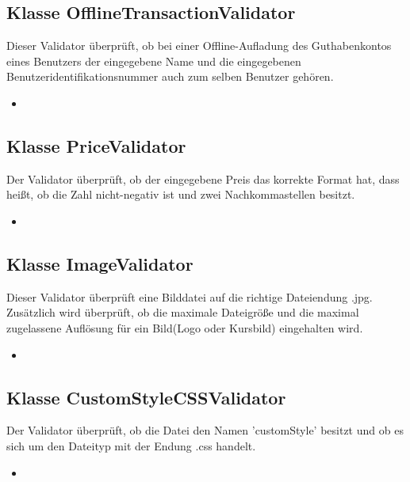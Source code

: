 	\subsection{Klasse OfflineTransactionValidator}
	Dieser Validator überprüft, ob bei einer Offline-Aufladung des Guthabenkontos eines Benutzers der eingegebene Name und die eingegebenen Benutzeridentifikationsnummer auch zum selben Benutzer gehören.
	\begin{itemize}
		\item \override
	\end{itemize}
	
	\subsection{Klasse PriceValidator}
	Der Validator überprüft, ob der eingegebene Preis das korrekte Format hat, dass heißt, ob die Zahl nicht-negativ ist und zwei Nachkommastellen besitzt.
	\begin{itemize}
		\item \override
	\end{itemize}
	
	\subsection{Klasse ImageValidator}
	Dieser Validator überprüft eine Bilddatei auf die richtige Dateiendung .jpg. Zusätzlich wird überprüft, ob
	die maximale Dateigröße und die maximal zugelassene Auflösung für ein Bild(Logo oder Kursbild) eingehalten wird.
	\begin{itemize}
		\item \override
	\end{itemize}
	
	\subsection{Klasse CustomStyleCSSValidator}
	Der Validator überprüft, ob die Datei den Namen 'customStyle' besitzt und ob es sich um den Dateityp mit der Endung .css handelt.
	\begin{itemize}
		\item \override
	\end{itemize}
	
